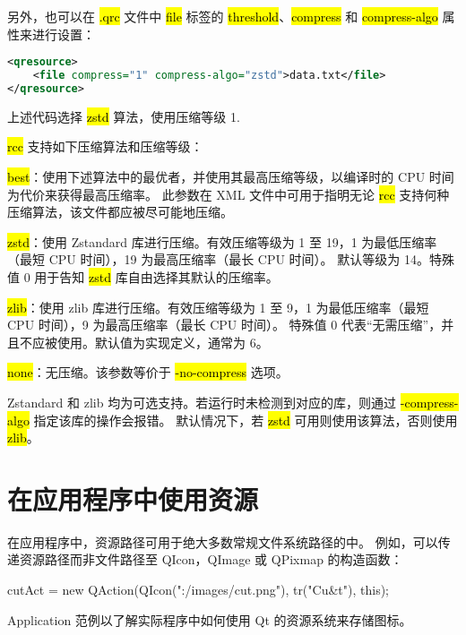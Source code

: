 另外，也可以在 \hl{.qrc} 文件中 \hl{file} 标签的 \hl{threshold}、\hl{compress} 和 \hl{compress-algo} 属性来进行设置：

\begin{lstlisting}[language=XML]  
<qresource>
    <file compress="1" compress-algo="zstd">data.txt</file>
</qresource>
\end{lstlisting}

上述代码选择 \hl{zstd} 算法，使用压缩等级 1.

\hl{rcc} 支持如下压缩算法和压缩等级：

\begin{compactitem}
\item \hl{best}：使用下述算法中的最优者，并使用其最高压缩等级，以编译时的 CPU 时间为代价来获得最高压缩率。
    此参数在 XML 文件中可用于指明无论 \hl{rcc} 支持何种压缩算法，该文件都应被尽可能地压缩。
\item \hl{zstd}：使用 Zstandard 库进行压缩。有效压缩等级为 1 至 19，1 为最低压缩率（最短 CPU 时间），19 为最高压缩率（最长 CPU 时间）。
 默认等级为 14。特殊值 0 用于告知 \hl{zstd} 库自由选择其默认的压缩率。
\item \hl{zlib}：使用 zlib 库进行压缩。有效压缩等级为 1 至 9，1 为最低压缩率（最短 CPU 时间），9 为最高压缩率（最长 CPU 时间）。
    特殊值 0 代表“无需压缩”，并且不应被使用。默认值为实现定义，通常为 6。
\item \hl{none}：无压缩。该参数等价于 \hl{-no-compress} 选项。
\end{compactitem}

Zstandard 和 zlib 均为可选支持。若运行时未检测到对应的库，则通过 \hl{-compress-algo} 指定该库的操作会报错。
默认情况下，若 \hl{zstd} 可用则使用该算法，否则使用 \hl{zlib}。

\section{在应用程序中使用资源}

在应用程序中，资源路径可用于绝大多数常规文件系统路径的中。
例如，可以传递资源路径而非文件路径至 QIcon，QImage 或 QPixmap 的构造函数：

\begin{cppcode}
cutAct = new QAction(QIcon(":/images/cut.png"), tr("Cu&t"), this);
\end{cppcode}

\begin{notice}
Application 范例以了解实际程序中如何使用 Qt 的资源系统来存储图标。
\end{notice}

